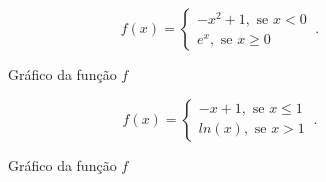 \begin{exem}
\begin{equation*}
f(x) = \begin{cases}
                 -x^2 + 1, \text{ se } x < 0 \\
                 e^x, \text{ se } x \geqslant 0
                \end{cases} \ .
\end{equation*}
   \begin{figure}[H]
  \centering
   \caption{Gráfico da função $f$}
  \end{figure}
\end{exem}

\begin{exem}
\begin{equation*}
f(x) = \begin{cases}
                 -x + 1, \text{ se } x \leqslant 1 \\
                 ln(x), \text{ se } x > 1
                \end{cases} \ .
\end{equation*}
\begin{figure}[H]
  \centering
   \caption{Gráfico da função $f$}
  \end{figure}
\end{exem}

